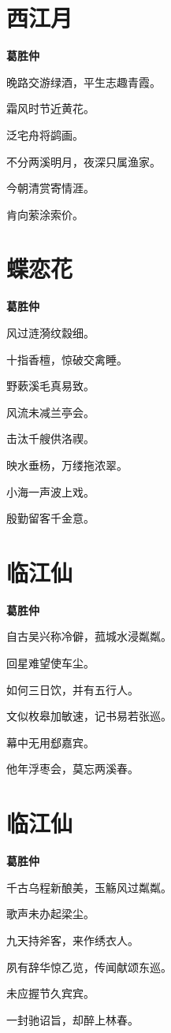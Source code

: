 \documentclass[12pt,a4paper]{ctexbook}
\begin{document}
\section{西江月}
\textbf{葛胜仲}\par\vspace{0.5em}
晚路交游绿酒，平生志趣青霞。\par
霜风时节近黄花。\par
泛宅舟将鹢画。\par
不分两溪明月，夜深只属渔家。\par
今朝清赏寄情涯。\par
肯向萦涂索价。\par

\section{蝶恋花}
\textbf{葛胜仲}\par\vspace{0.5em}
风过涟漪纹縠细。\par
十指香檀，惊破交禽睡。\par
野蔌溪毛真易致。\par
风流未减兰亭会。\par
击汰千艘供洛禊。\par
映水垂杨，万缕拖浓翠。\par
小海一声波上戏。\par
殷勤留客千金意。\par

\section{临江仙}
\textbf{葛胜仲}\par\vspace{0.5em}
自古吴兴称冷僻，菰城水浸粼粼。\par
回星难望使车尘。\par
如何三日饮，并有五行人。\par
文似枚皋加敏速，记书易若张巡。\par
幕中无用郄嘉宾。\par
他年浮枣会，莫忘两溪春。\par

\section{临江仙}
\textbf{葛胜仲}\par\vspace{0.5em}
千古乌程新酿美，玉觞风过粼粼。\par
歌声未办起梁尘。\par
九天持斧客，来作绣衣人。\par
夙有辞华惊乙览，传闻献颂东巡。\par
未应握节久宾宾。\par
一封驰诏旨，却醉上林春。\par
\end{document}
